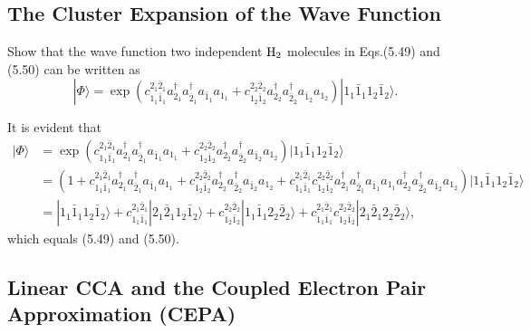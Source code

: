 \documentclass[a4paper]{book}
\newcounter{exercise}[chapter]
\newcounter{solution}[chapter]
\begin{document}
	\subsection{The Cluster Expansion of the Wave Function}
	
	\begin{exercise}
	Show that the wave function two independent $\ce{H2}$ molecules in Eqs.(5.49) and (5.50) can be written as
	\[
		| \Phi \rangle = \exp{( c^{2_1 \bar{2}_1}_{1_1 \bar{1}_1} a^\dagger_{2_1} a^\dagger_{\bar{2}_1} a_{\bar{1}_1} a_{1_1} + c^{2_2 \bar{2}_2}_{1_2 \bar{1}_2} a^\dagger_{2_2} a^\dagger_{\bar{2}_2} a_{\bar{1}_2} a_{1_2} )} | 1_1 \bar{1}_1 1_2 \bar{1}_2 \rangle.
	\]
	\end{exercise}
	
	\begin{solution}
	It is evident that
	\begin{align*}
		| \Phi \rangle &= \exp( c^{ 2_1 \bar{2}_1}_{ 1_1 \bar{1}_1 } a^\dagger_{2_1} a^\dagger_{\bar{2}_1} a_{\bar{1}_1} a_{1_1} + c^{ 2_2 \bar{2}_2 }_{ 1_2 \bar{1}_2 } a^\dagger_{2_2} a^\dagger_{\bar{2}_2} a_{\bar{1}_2} a_{1_2} ) | 1_1 \bar{1}_1 1_2 \bar{1}_2 \rangle \\
		&= ( 1 + c^{ 2_1 \bar{2}_1}_{ 1_1 \bar{1}_1 } a^\dagger_{2_1} a^\dagger_{\bar{2}_1} a_{\bar{1}_1} a_{1_1} + c^{ 2_2 \bar{2}_2 }_{ 1_2 \bar{1}_2 } a^\dagger_{2_2} a^\dagger_{\bar{2}_2} a_{\bar{1}_2} a_{1_2} + c^{ 2_1 \bar{2}_1}_{ 1_1 \bar{1}_1 } c^{ 2_2 \bar{2}_2 }_{ 1_2 \bar{1}_2 } a^\dagger_{2_1} a^\dagger_{\bar{2}_1} a_{\bar{1}_1} a_{1_1}  a^\dagger_{2_2} a^\dagger_{\bar{2}_2} a_{\bar{1}_2} a_{1_2} ) | 1_1 \bar{1}_1 1_2 \bar{1}_2 \rangle \\
		&= | 1_1 \bar{1}_1 1_2 \bar{1}_2 \rangle + c^{ 2_1 \bar{2}_1}_{ 1_1 \bar{1}_1 } | 2_1 \bar{2}_1 1_2 \bar{1}_2 \rangle + c^{ 2_2 \bar{2}_2 }_{ 1_2 \bar{1}_2 } | 1_1 \bar{1}_1 2_2 \bar{2}_2 \rangle +  c^{ 2_1 \bar{2}_1}_{ 1_1 \bar{1}_1 } c^{ 2_2 \bar{2}_2 }_{ 1_2 \bar{1}_2 } | 2_1 \bar{2}_1 2_2 \bar{2}_2 \rangle,
	\end{align*}
	which equals (5.49) and (5.50). 
			
	\end{solution}
	
	\subsection{Linear CCA and the Coupled Electron Pair Approximation (CEPA)}
	
\end{document}
